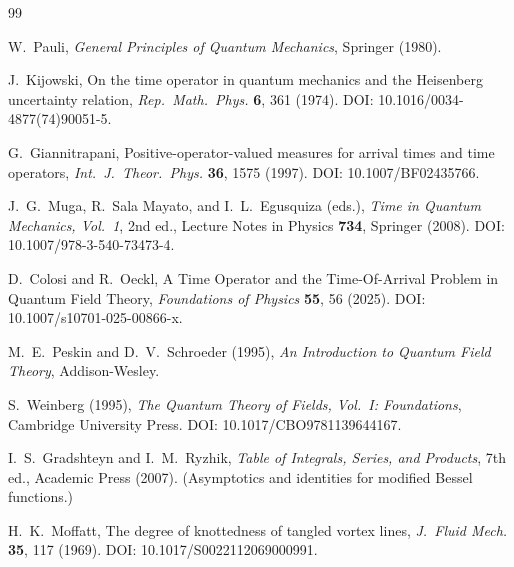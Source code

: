 \documentclass[pdflatex,sn-mathphys-num]{sn-jnl}
\theoremstyle{thmstylethree}
\theoremstyle{thmstyleone}
\theoremstyle{thmstyletwo}
\numberwithin{equation}{section}
\begin{document}
        \begin{thebibliography}{99}
            
            W.~Pauli,
            \textit{General Principles of Quantum Mechanics},
            Springer (1980).
            
            J.~Kijowski,
            On the time operator in quantum mechanics and the Heisenberg uncertainty relation,
            \textit{Rep.\ Math.\ Phys.} \textbf{6}, 361 (1974).
            DOI: 10.1016/0034-4877(74)90051-5.
            
            G.~Giannitrapani,
            Positive-operator-valued measures for arrival times and time operators,
            \textit{Int.\ J.\ Theor.\ Phys.} \textbf{36}, 1575 (1997).
            DOI: 10.1007/BF02435766.
            
            J.~G.~Muga, R.~Sala Mayato, and I.~L.~Egusquiza (eds.),
            \textit{Time in Quantum Mechanics, Vol.~1},
            2nd ed., Lecture Notes in Physics \textbf{734},
            Springer (2008).
            DOI: 10.1007/978-3-540-73473-4.
            
            D.~Colosi and R.~Oeckl,
            A Time Operator and the Time-Of-Arrival Problem in Quantum Field Theory,
            \textit{Foundations of Physics} \textbf{55}, 56 (2025).
            DOI: 10.1007/s10701-025-00866-x.
            
            M.~E.~Peskin and D.~V.~Schroeder (1995),
            \textit{An Introduction to Quantum Field Theory},
            Addison-Wesley.
            
            S.~Weinberg (1995),
            \textit{The Quantum Theory of Fields, Vol.\ I: Foundations},
            Cambridge University Press.
            DOI: 10.1017/CBO9781139644167.
            
            I.~S.~Gradshteyn and I.~M.~Ryzhik,
            \textit{Table of Integrals, Series, and Products},
            7th ed., Academic Press (2007).
            (Asymptotics and identities for modified Bessel functions.)
            
            H.~K.~Moffatt,
            The degree of knottedness of tangled vortex lines,
            \textit{J.\ Fluid Mech.} \textbf{35}, 117 (1969).
            DOI: 10.1017/S0022112069000991.
            

\end{thebibliography}
\end{document}
